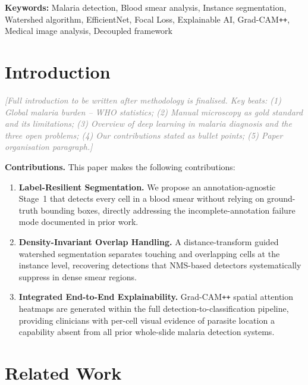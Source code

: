 \documentclass[10pt,twocolumn]{article}
\newcommand{\placeholder}[1]{\textcolor{gray}{\textit{#1}}}
\begin{document}
\smallskip
\noindent\textbf{Keywords:}
Malaria detection,
Blood smear analysis,
Instance segmentation,
Watershed algorithm,
EfficientNet,
Focal Loss,
Explainable AI,
Grad-CAM\texttt{++},
Medical image analysis,
Decoupled framework


\section{Introduction}
\label{sec:intro}

\placeholder{%
[Full introduction to be written after methodology is finalised.
Key beats: (1) Global malaria burden -- WHO statistics; (2) Manual microscopy
as gold standard and its limitations; (3) Overview of deep learning in malaria
diagnosis and the three open problems; (4) Our contributions stated as bullet
points; (5) Paper organisation paragraph.]}

\noindent\textbf{Contributions.} This paper makes the following contributions:
\begin{enumerate}[leftmargin=*, label=\textbf{C\arabic*.}]
  \item \textbf{Label-Resilient Segmentation.} We propose an
    annotation-agnostic Stage~1 that detects every cell in a blood smear
    without relying on ground-truth bounding boxes, directly addressing
    the incomplete-annotation failure mode documented in prior work.
  \item \textbf{Density-Invariant Overlap Handling.} A distance-transform
    guided watershed segmentation separates touching and overlapping cells
    at the instance level, recovering detections that NMS-based detectors
    systematically suppress in dense smear regions.
  \item \textbf{Integrated End-to-End Explainability.} Grad-CAM\texttt{++}
    spatial attention heatmaps are generated within the full
    detection-to-classification pipeline, providing clinicians with
    per-cell visual evidence of parasite location a capability absent
    from all prior whole-slide malaria detection systems.
\end{enumerate}


\section{Related Work}
\label{sec:related}
\end{document}
